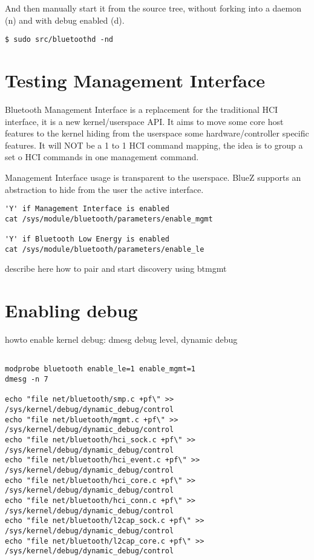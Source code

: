 \documentclass[11pt]{article}
\begin{document}
And then manually start it from the source tree, without forking into a daemon
(n) and with debug enabled (d).

\begin{verbatim}
$ sudo src/bluetoothd -nd
\end{verbatim}

\section{Testing Management Interface}

Bluetooth Management Interface is a replacement for the traditional HCI
interface, it is a new kernel/userspace API. It aims to move some core host
features to the kernel hiding from the userspace some hardware/controller
specific features. It will NOT be a 1 to 1 HCI command mapping, the idea is
to group a set o HCI commands in one management command.

Management Interface usage is transparent to the userspace. BlueZ supports
an abstraction to hide from the user the active interface.

\begin{verbatim}
'Y' if Management Interface is enabled
cat /sys/module/bluetooth/parameters/enable_mgmt

'Y' if Bluetooth Low Energy is enabled
cat /sys/module/bluetooth/parameters/enable_le
\end{verbatim}

describe here how to pair and start discovery using btmgmt


\section{Enabling debug}

howto enable kernel debug: dmesg debug level, dynamic debug

\begin{verbatim}

modprobe bluetooth enable_le=1 enable_mgmt=1
dmesg -n 7

echo "file net/bluetooth/smp.c +pf\" >> /sys/kernel/debug/dynamic_debug/control
echo "file net/bluetooth/mgmt.c +pf\" >> /sys/kernel/debug/dynamic_debug/control
echo "file net/bluetooth/hci_sock.c +pf\" >> /sys/kernel/debug/dynamic_debug/control
echo "file net/bluetooth/hci_event.c +pf\" >> /sys/kernel/debug/dynamic_debug/control
echo "file net/bluetooth/hci_core.c +pf\" >> /sys/kernel/debug/dynamic_debug/control
echo "file net/bluetooth/hci_conn.c +pf\" >> /sys/kernel/debug/dynamic_debug/control
echo "file net/bluetooth/l2cap_sock.c +pf\" >> /sys/kernel/debug/dynamic_debug/control
echo "file net/bluetooth/l2cap_core.c +pf\" >> /sys/kernel/debug/dynamic_debug/control
\end{verbatim}
\end{document}
